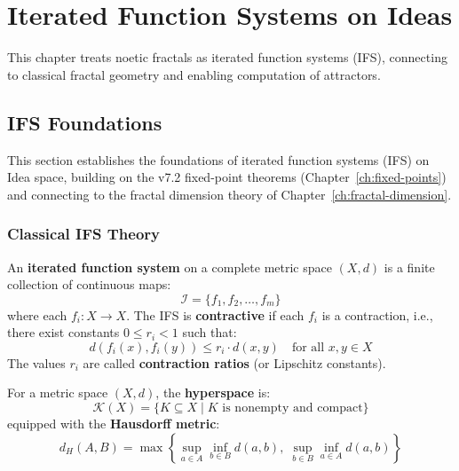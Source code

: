 \chapter{Iterated Function Systems on Ideas}
\label{ch:ifs-ideas}

\begin{tcolorbox}[colback=blue!5!white,colframe=blue!75!black,title=\vnewthree]
This chapter treats noetic fractals as iterated function systems (IFS), connecting to classical fractal geometry and enabling computation of attractors.
\end{tcolorbox}

\section{IFS Foundations}
\label{sec:ifs-foundations}

\begin{tcolorbox}[colback=blue!5!white,colframe=blue!75!black,title=\vnewthree]
This section establishes the foundations of iterated function systems (IFS) on Idea space, building on the v7.2 fixed-point theorems (Chapter~\ref*{ch:fixed-points}) and connecting to the fractal dimension theory of Chapter~\ref{ch:fractal-dimension}.
\end{tcolorbox}

\subsection{Classical IFS Theory}

\begin{definition}
\label{def:ifs}
An \textbf{iterated function system} on a complete metric space $(X, d)$ is a finite collection of continuous maps:
\[
\mathcal{I} = \{f_1, f_2, \ldots, f_m\}
\]
where each $f_i : X \to X$. The IFS is \textbf{contractive} if each $f_i$ is a contraction, i.e., there exist constants $0 \leq r_i < 1$ such that:
\[
d(f_i(x), f_i(y)) \leq r_i \cdot d(x, y) \quad \text{for all } x, y \in X
\]
The values $r_i$ are called \textbf{contraction ratios} (or Lipschitz constants).
\end{definition}

\begin{definition}
\label{def:hyperspace}
For a metric space $(X, d)$, the \textbf{hyperspace} is:
\[
\mathcal{K}(X) = \{K \subseteq X \mid K \text{ is nonempty and compact}\}
\]
equipped with the \textbf{Hausdorff metric}:
\[
d_H(A, B) = \max\left\{\sup_{a \in A} \inf_{b \in B} d(a, b), \; \sup_{b \in B} \inf_{a \in A} d(a, b)\right\}
\]
\end{definition}


